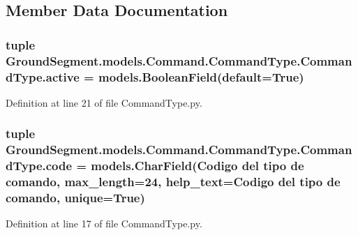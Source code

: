\subsection{Member Data Documentation}
\hypertarget{class_ground_segment_1_1models_1_1_command_1_1_command_type_1_1_command_type_a9f270dc2d690e83cc5963c8b8e752017}{}
\subsubsection[{active}]{\setlength{\rightskip}{0pt plus 5cm}tuple Ground\+Segment.\+models.\+Command.\+Command\+Type.\+Command\+Type.\+active = models.\+Boolean\+Field(default=True)\hspace{0.3cm}{\ttfamily [static]}}\label{class_ground_segment_1_1models_1_1_command_1_1_command_type_1_1_command_type_a9f270dc2d690e83cc5963c8b8e752017}


Definition at line 21 of file Command\+Type.\+py.

\hypertarget{class_ground_segment_1_1models_1_1_command_1_1_command_type_1_1_command_type_ae680169344efd4f82a2d42727944903c}{}
\subsubsection[{code}]{\setlength{\rightskip}{0pt plus 5cm}tuple Ground\+Segment.\+models.\+Command.\+Command\+Type.\+Command\+Type.\+code = models.\+Char\+Field(\textquotesingle{}Codigo del tipo de comando\textquotesingle{}, max\+\_\+length=24, help\+\_\+text=\textquotesingle{}Codigo del tipo de comando\textquotesingle{}, unique=True)\hspace{0.3cm}{\ttfamily [static]}}\label{class_ground_segment_1_1models_1_1_command_1_1_command_type_1_1_command_type_ae680169344efd4f82a2d42727944903c}


Definition at line 17 of file Command\+Type.\+py.

